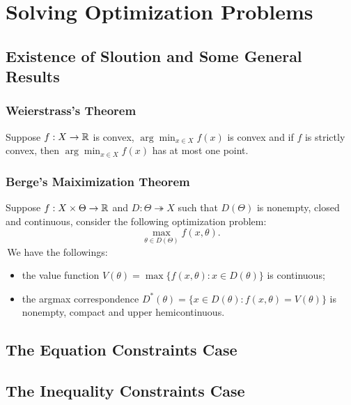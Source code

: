 \section{Solving Optimization Problems}
\subsection{Existence of Sloution and Some General Results}
\subsubsection{Weierstrass's Theorem}
\begin{theorem}[Weierstrass]
    Suppose $f: X\to \mathbb{R}$ is convex, $\arg \min_{x\in X}f(x)$ is convex and if $f$ is strictly convex, then $\arg \min_{x\in X}f(x)$ has at most one point.
\end{theorem}
\subsubsection{Berge's Maiximization Theorem}
\begin{theorem}[Berge]
    Suppose $f:X\times \Theta \to \mathbb{R}$ and $D:\Theta\twoheadrightarrow X$ such that $D(\Theta)$ is nonempty, closed and continuous, consider the following optimization problem:
    $$\max_{\theta \in D(\Theta)} f(x,\theta).$$
    \,We have the followings:
    \begin{itemize}
        \item the value function $V(\theta) = \max\{f(x,\theta): x\in D(\theta)\}$ is continuous;
        \item the argmax correspondence $D^*(\theta)=\{x\in D(\theta): f(x,\theta) = V(\theta) \}$ is nonempty, compact and upper hemicontinuous.
    \end{itemize}
\end{theorem}

\subsection{The Equation Constraints Case}

\subsection{The Inequality Constraints Case}